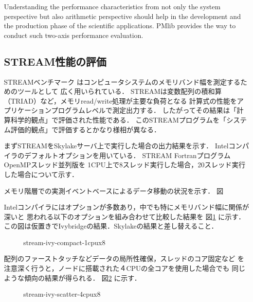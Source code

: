 \documentclass[conference]{IEEEtran}
\begin{document}
Understanding the performance characteristics from not only the
system perspective but also arithmetic perspective should help in the
development and the production phase of the scientific applications.
PMlib provides the way to conduct such two-axis performance evaluation.



\subsection{STREAM性能の評価}
STREAMベンチマーク\cite{stream:1995}
はコンピュータシステムのメモリバンド幅を測定するためのツールとして
広く用いられている．
STREAMは変数配列の積和算（TRIAD）など，メモリread/write処理が主要な負荷となる
計算式の性能をアプリケーションプログラムレベルで測定出力する．
したがってその結果は「計算科学的観点」で評価された性能である．
このSTREAMプログラムを「システム評価的観点」で評価するとかなり様相が異なる．

まずSTREAMをSkylakeサーバ上で実行した場合の出力結果を示す．
Intelコンパイラのデフォルトオプションを用いている．
STREAM FortranプログラムOpenMPスレッド並列版を
1CPU上で8スレッド実行した場合，20スレッド実行した場合について示す．

メモリ階層での実測イベントベースによるデータ移動の状況を示す．
図


Intelコンパイラにはオプションが多数あり，中でも特にメモリバンド幅に関係が深いと
思われる以下のオプションを組み合わせて比較した結果を
図\ref{fig:stream-ivy-compact-1cpux8} に示す．\\
{\color{blue}この図は仮置きでIvybridgeの結果．Skylakeの結果と差し替えること．}

\begin{figure}[bt]
\centering
\caption{stream-ivy-compact-1cpux8}
\label{fig:stream-ivy-compact-1cpux8}
\end{figure}


配列のファーストタッチなどデータの局所性確保，スレッドのコア固定など
を注意深く行うと，ノードに搭載された４CPUの全コアを使用した場合でも
同じような傾向の結果が得られる．
図\ref{fig:stream-ivy-scatter-4cpux8} に示す．\\

\begin{figure}[bt]
\centering
\caption{stream-ivy-scatter-4cpux8}
\label{fig:stream-ivy-scatter-4cpux8}
\end{figure}
\end{document}

